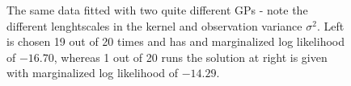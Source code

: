\begin{figure}[H]
\begin{minipage}[b]{0.49\textwidth}
     \end{minipage}
     \caption{The same data fitted with two quite different GPs - note the different lenghtscales in the
     kernel and observation variance $\sigma^2$. Left is chosen 19 out of 20 times and has and marginalized log likelihood of $-16.70$,
     whereas 1 out of 20 runs the solution at right is given with marginalized log likelihood of
     $-14.29$.}
     \label{GP_two_results}
\end{figure}
